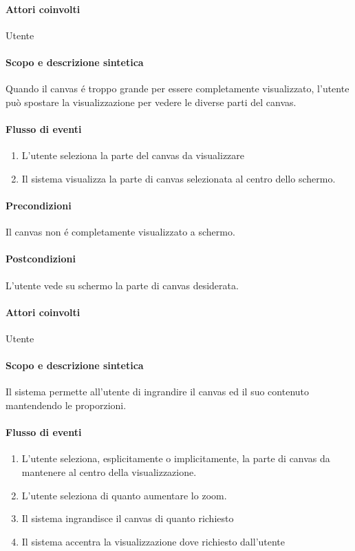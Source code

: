 \paragraph{Attori coinvolti} Utente
\paragraph{Scopo e descrizione sintetica}
Quando il canvas \'e troppo grande per essere completamente visualizzato, l'utente pu\`o spostare la visualizzazione per vedere le diverse parti del canvas.
\paragraph{Flusso di eventi}
\begin{enumerate}
\item L'utente seleziona la parte del canvas da visualizzare
\item Il sistema visualizza la parte di canvas selezionata al centro dello schermo.
\end{enumerate}
\paragraph{Precondizioni} Il canvas non \'e completamente visualizzato a schermo.
\paragraph{Postcondizioni} L'utente vede su schermo la parte di canvas desiderata.

\paragraph{Attori coinvolti} Utente
\paragraph{Scopo e descrizione sintetica} 
Il sistema permette all'utente di ingrandire il canvas ed il suo contenuto mantendendo le proporzioni.
\paragraph{Flusso di eventi}
\begin{enumerate}
\item L'utente seleziona, esplicitamente o implicitamente, la parte di canvas da mantenere al centro della visualizzazione.
\item L'utente seleziona di quanto aumentare lo zoom.
\item Il sistema ingrandisce il canvas di quanto richiesto
\item Il sistema accentra la visualizzazione dove richiesto dall'utente
\end{enumerate}
